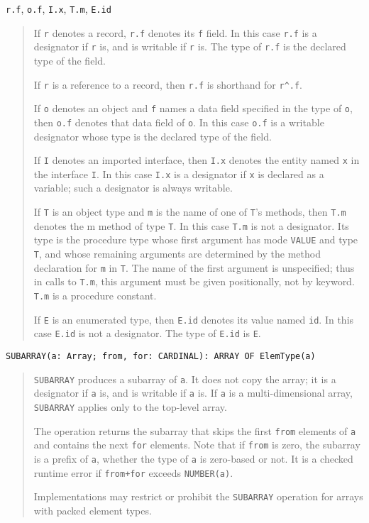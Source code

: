 \documentclass[10pt]{article}
\begin{document}
\verb|r.f|, \verb|o.f|, \verb|I.x|, \verb|T.m|, \verb|E.id|
\begin{quote}
  If \verb|r| denotes a record, \verb|r.f| denotes its \verb|f| field.  In
  this case \verb|r.f| is a designator if \verb|r| is, and is writable if
  \verb|r| is.  The type of \verb|r.f| is the declared type of the field.

  If \verb|r| is a reference to a record, then \verb|r.f| is shorthand for
  \verb|r^.f|.

  If \verb|o| denotes an object and \verb|f| names a data field specified in
  the type of \verb|o|, then \verb|o.f| denotes that data field of \verb|o|.
  In this case \verb|o.f| is a writable designator whose type is the declared
  type of the field.

  If \verb|I| denotes an imported interface, then \verb|I.x| denotes the
  entity named \verb|x| in the interface \verb|I|.  In this case \verb|I.x| is
  a designator if \verb|x| is declared as a variable; such a designator is
  always writable.

  If \verb|T| is an object type and \verb|m| is the name of one of \verb|T|'s
  methods, then \verb|T.m| denotes the m method of type \verb|T|.  In this
  case \verb|T.m| is not a designator.  Its type is the procedure type whose
  first argument has mode \verb|VALUE| and type \verb|T|, and whose remaining
  arguments are determined by the method declaration for \verb|m| in \verb|T|.
  The name of the first argument is unspecified; thus in calls to \verb|T.m|,
  this argument must be given positionally, not by keyword.  \verb|T.m| is a
  procedure constant.

  If \verb|E| is an enumerated type, then \verb|E.id| denotes its value named
  \verb|id|.  In this case \verb|E.id| is not a designator.  The type of
  \verb|E.id| is \verb|E|.
\end{quote}

\verb|SUBARRAY(a: Array; from, for: CARDINAL): ARRAY OF ElemType(a)|
\begin{quote}
  \verb|SUBARRAY| produces a subarray of \verb|a|.  It does not copy the
  array; it is a designator if \verb|a| is, and is writable if \verb|a| is.
  If \verb|a| is a multi-dimensional array, \verb|SUBARRAY| applies only to
  the top-level array.

  The operation returns the subarray that skips the first \verb|from| elements
  of \verb|a| and contains the next \verb|for| elements.  Note that if
  \verb|from| is zero, the subarray is a prefix of \verb|a|, whether the type
  of \verb|a| is zero-based or not.  It is a checked runtime error if
  \verb|from+for| exceeds \verb|NUMBER(a)|.

  Implementations may restrict or prohibit the \verb|SUBARRAY| operation for
  arrays with packed element types.
\end{quote}
\end{document}
